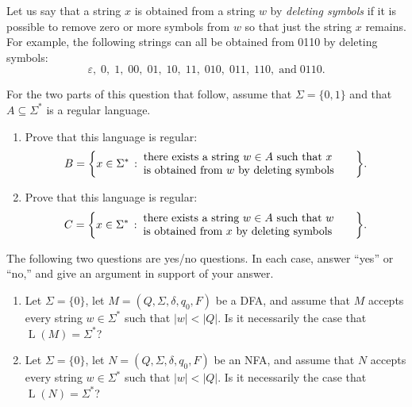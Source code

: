 \documentclass[11pt]{article}
\newcommand{\op}[1]{\operatorname{#1}}
\newcommand{\abs}[1]{\lvert #1 \rvert}
\newenvironment{mylist}[1]{\begin{list}{}{
	\setlength{\leftmargin}{#1}
	\setlength{\rightmargin}{0mm}
	\setlength{\labelsep}{2mm}
	\setlength{\labelwidth}{8mm}
	\setlength{\itemsep}{0mm}}}
	{\end{list}}
\newcounter{questioncounter}
\newenvironment{question}{
  \begin{mylist}{\parindent}
  \item[\stepcounter{questioncounter}
    \thequestioncounter.]}{
\end{mylist}}
\begin{document}
\begin{question}[6 points]
  Let us say that a string $x$ is obtained from a string $w$ by
  \emph{deleting symbols} if it is possible to remove zero or more symbols
  from $w$ so that just the string $x$ remains.
  For example, the following strings can all be obtained from 0110 by
  deleting symbols:
  \[
  \varepsilon,\;
  0,\;
  1,\;
  00,\; 
  01,\;
  10,\;
  11,\;
  010,\; 
  011,\;
  110,\; \text{and} \; 
  0110.
  \]
  
  For the two parts of this question that follow, assume that 
  $\Sigma = \{0,1\}$ and that $A\subseteq\Sigma^{\ast}$ is a regular language.
  \begin{enumerate}
  \item[(a)]
    Prove that this language is regular:
    \[
    B = \biggl\{x\in\Sigma^{\ast}\,:\;
    \parbox[c]{2.65in}{
      there exists a string $w\in A$ such that $x$\\
      is obtained from $w$ by deleting symbols}
    \biggr\}.
    \]
  \item[(b)]
    Prove that this language is regular:
    \[
    C = \biggl\{x\in\Sigma^{\ast}\,:\;
    \parbox[c]{2.65in}{
      there exists a string $w\in A$ such that $w$\\
      is obtained from $x$ by deleting symbols}
    \biggr\}.
    \]
  \end{enumerate}
\end{question}


\begin{question}[6 points]
  The following two questions are yes/no questions.
  In each case, answer ``yes'' or ``no,'' and give an argument in support
  of your answer.
  \begin{enumerate}
  \item[(a)]
    Let $\Sigma = \{0\}$, let $M = (Q,\Sigma,\delta,q_0,F)$ be a DFA, and
    assume that $M$ accepts every string $w\in\Sigma^{\ast}$ such that
    $\abs{w}<\abs{Q}$.
    Is it necessarily the case that $\op{L}(M) = \Sigma^{\ast}$?
  \item[(b)]
    Let $\Sigma = \{0\}$, let $N = (Q,\Sigma,\delta,q_0,F)$ be an NFA, and
    assume that $N$ accepts every string $w\in\Sigma^{\ast}$ such that
    $\abs{w}<\abs{Q}$.
    Is it necessarily the case that $\op{L}(N) = \Sigma^{\ast}$?
  \end{enumerate}
\end{question}
\end{document}
